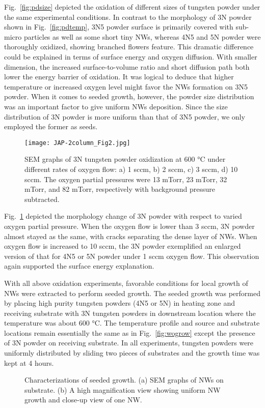 Fig.~\ref{fig:pdsize} depicted the oxidation of different sizes of tungsten powder under the same experimental conditions. In contrast to the morphology of 3N powder shown in Fig.~\ref{fig:pdtemp}, 3N5 powder surface is primarily covered with sub-micro particles as well as some short tiny NWs, whereas 4N5 and 5N powder were thoroughly oxidized, showing branched flowers feature. This dramatic difference could be explained in terms of surface energy and oxygen diffusion. With smaller dimension, the increased surface-to-volume ratio and short diffusion path both lower the energy barrier of oxidation.\cite{tungsten1999} It was logical to deduce that higher temperature or increased oxygen level might favor the NWs formation on 3N5 powder. When it comes to seeded growth, however, the powder size distribution was an important factor to give uniform NWs deposition. Since the size distribution of 3N powder is more uniform than that of 3N5 powder, we only employed the former as seeds.
\begin{figure}[htb]
\centering
\texttt{[image: JAP-2column\_Fig2.jpg]}
\caption[W powder oxidation: oxygen pressure]{SEM graphs of 3N tungsten powder oxidization at 600 \si{\degreeCelsius} under different rates of oxygen flow: a) 1 sccm, b) 2 sccm, c) 3 sccm, d) 10 sccm. The oxygen partial pressures were 13 mTorr, 23 mTorr, 32 mTorr, and 82 mTorr, respectively with background pressure subtracted.}
\label{fig:pdoxy}
\end{figure}

Fig.~\ref{fig:pdoxy} depicted the morphology change of 3N powder with respect to varied oxygen partial pressure. When the oxygen flow is lower than 3 sccm, 3N powder almost stayed as the same, with cracks separating the dense layer of NWs. When oxygen flow is increased to 10 sccm, the 3N powder exemplified an enlarged version of that for 4N5 or 5N powder under 1 sccm oxygen flow. This observation again supported the surface energy explanation.

With all above oxidation experiments, favorable conditions for local growth of NWs were extracted to perform seeded growth. The seeded growth was performed by placing high purity tungsten powders (4N5 or 5N) in heating zone and receiving substrate with 3N tungsten powders in downstream location where the temperature was about 600 \si{\degreeCelsius}. The temperature profile and source and substrate locations remain essentially the same as in Fig.~\ref{fig:wogrow} except the presence of 3N powder on receiving substrate. In all experiments, tungsten powders were uniformly distributed by sliding two pieces of substrates and the growth time was kept at 4 hours.
\begin{figure}[htb]
\centering
{}\hspace{0.04\textwidth}
\caption[Characterization of seeded growth : SEM]{Characterizations of seeded growth. (a) SEM graphs of  NWs on  substrate. (b) A high magnification view showing uniform NW growth and close-up view of one NW. }
\label{fig:woseedsem}
\end{figure}


